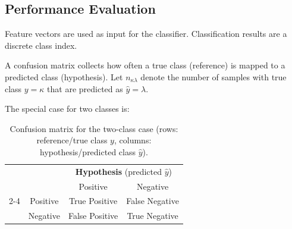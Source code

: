 \documentclass{article}
\begin{document}
\subsection[Performance Evaluation]{Performance Evaluation~\autocite{duda2001,hastie2009}}

Feature vectors are used as input for the classifier.
Classification results are a discrete class index.

A confusion matrix collects how often a true class (reference) is mapped to a predicted class (hypothesis). Let $n_{\kappa\lambda}$ denote the number of samples with true class $y=\kappa$ that are predicted as $\hat y=\lambda$.

The special case for two classes is:

\begin{table}
  \caption{Confusion matrix for the two-class case (rows: reference/true class $y$, columns: hypothesis/predicted class $\hat y$).}
  \label{tab:confusion_2class}
      \centering
      \small
      \begin{tabular}{c c | c c }
          & \multicolumn{1}{c}{}  & \multicolumn{2}{c}{\textbf{Hypothesis} (predicted $\hat y$)}                         \\
          &                       & {Positive}                     & {Negative} \\
         \cline{2-4}
         \multirow{2}{*}{\textbf{Reference} ($y$)}
          & {Positive} & True Positive                             & False Negative        \\
          & {Negative} & False Positive                            & True Negative         \\
      \end{tabular}
   \end{table}
   
\end{document}
